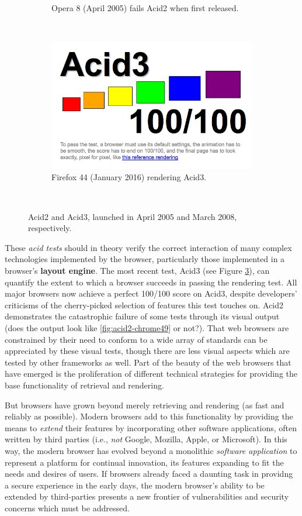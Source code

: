 \documentclass[a4paper, 11pt]{article} %
\begin{document}
\begin{figure}
\begin{subfigure}[b]{0.3\textwidth}
		\caption{Opera 8 (April 2005) fails Acid2 when first released.}
		\label{fig:acid2-opera8-fail}
	\end{subfigure}
	~
	\begin{subfigure}[b]{0.3\textwidth}
		\includegraphics[width=\textwidth]{acid3-firefox44}
		\caption{Firefox 44 (January 2016) rendering Acid3.}
		\label{fig:acid3-firefox}
	\end{subfigure}
	\caption{Acid2 and Acid3, launched in April 2005 and March 2008, respectively.}\
\end{figure}

These \textit{acid tests} should in theory verify the correct interaction of many complex technologies implemented by the browser, particularly those implemented in a browser's \textbf{layout engine}. The most recent test, Acid3 (see Figure \ref{fig:acid3-firefox}), can quantify the extent to which a browser succeeds in passing the rendering test. All major browsers now achieve a perfect 100/100 score on Acid3, despite developers' criticisms of the cherry-picked selection of features this test touches on. Acid2 demonstrates the catastrophic failure of some tests through its visual output (does the output look like \ref{fig:acid2-chrome49} or not?). That web browsers are constrained by their need to conform to a wide array of standards can be appreciated by these visual tests, though there are less visual aspects which are tested by other frameworks as well. Part of the beauty of the web browsers that have emerged is the proliferation of different technical strategies for providing the base functionality of retrieval and rendering.

But browsers have grown beyond merely retrieving and rendering (as fast and reliably as possible). Modern browsers add to this functionality by providing the means to \textit{extend} their features by incorporating other software applications, often written by third parties (i.e., \textit{not} Google, Mozilla, Apple, or Microsoft). In this way, the modern browser has evolved beyond a monolithic \textit{software application} to represent a platform for continual innovation, its features expanding to fit the needs and desires of users. If browsers already faced a daunting task in providng a secure experience in the early days, the modern browser's ability to be extended by third-parties presents a new frontier of vulnerabilities and security concerns which must be addressed.
\end{document}
